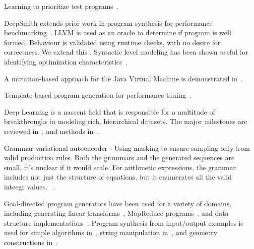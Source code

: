 Learning to prioritize test programs~\cite{Chen2017}.

DeepSmith extends prior work in program synthesis for performance benchmarking~\cite{Cummins2017a}. LLVM is used as an oracle to determine if program is well formed. Behaviour is validated using runtime checks, with no desire for correctness. We extend this \cc{\ldots}. Syntactic level modeling has been shown useful for identifying optimization characteristics~\cite{Cummins2017b}.

A mutation-based approach for the Java Virtual Machine is demonstrated in~\cite{Chena}.

Template-based program generation for performance tuning~\cite{Han2017}.


Deep Learning is a nascent field that is responsible for a multitude of breakthroughs in modeling rich, hierarchical datasets. The major milestones are reviewed in~\cite{Wang2017}, and methods in~\cite{Schmidhuber2014}.

Grammar variational autoencoder - Using masking to ensure sampling only from valid production rules. Both the grammars and the generated sequences are small, it's unclear if it would scale. For arithmetic expressions, the grammar includes not just the structure of equations, but it enumerates all the valid inteegr values. ~\cite{Kusner2017}.

Goal-directed program generators have been used for a variety of domains, including generating linear transforms~\cite{Voronenko2009}, MapReduce programs~\cite{Smith}, and data structure implementations~\cite{Loncaric2016}. Program synthesis from input/output examples is used for simple algorithms in~\cite{Zaremba2015a}, string manipulation in~\cite{Gulwani2011}, and geometry constructions in~\cite{Gulwani2012}.

